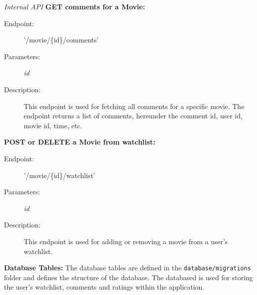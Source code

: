 \textit{Internal API}
\textbf{GET comments for a Movie:}
\begin{description}
    \item [Endpoint:] '/movie/\{id\}/comments'
    \item [Parameters:] \textit{id}
    \item [Description:] This endpoint is used for fetching all comments for a specific movie. The endpoint returns a list of comments, hereunder the comment id, user id, movie id, time, etc.
\end{description}
\textbf{POST or DELETE a Movie from watchlist:}
\begin{description}
    \item [Endpoint:] '/movie/\{id\}/watchlist'
    \item [Parameters:] \textit{id}
    \item [Description:] This endpoint is used for adding or removing a movie from a user's watchlist.
\end{description}


\textbf{Database Tables:}
The database tables are defined in the \texttt{database/migrations} folder and defines the structure of the database. The databased is used for storing the user's watchlist, comments and ratings within the application.

